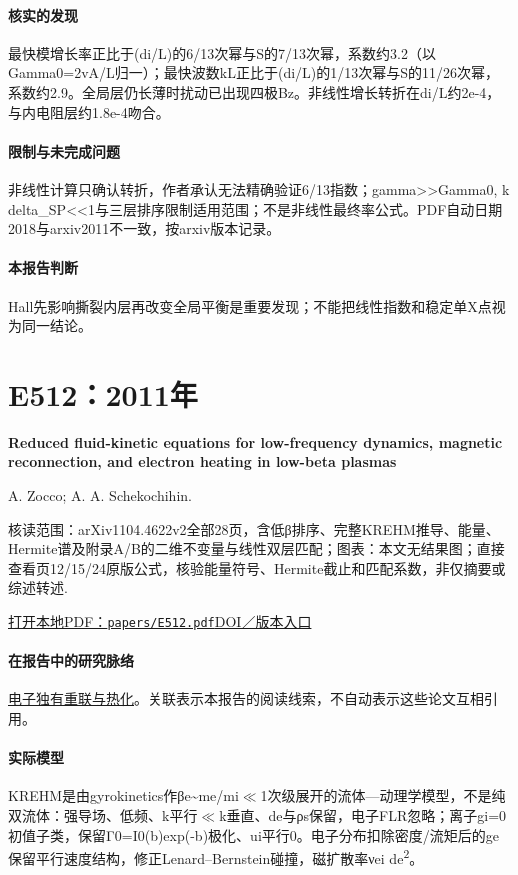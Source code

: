 \paragraph{核实的发现}最快模增长率正比于(di/L)的6/13次幂与S的7/13次幂，系数约3.2（以Gamma0=2vA/L归一）；最快波数kL正比于(di/L)的1/13次幂与S的11/26次幂，系数约2.9。全局层仍长薄时扰动已出现四极Bz。非线性增长转折在di/L约2e-4，与内电阻层约1.8e-4吻合。

\paragraph{限制与未完成问题}非线性计算只确认转折，作者承认无法精确验证6/13指数；gamma>>Gamma0, k delta\_SP<<1与三层排序限制适用范围；不是非线性最终率公式。PDF自动日期2018与arxiv2011不一致，按arxiv版本记录。

\paragraph{本报告判断}Hall先影响撕裂内层再改变全局平衡是重要发现；不能把线性指数和稳定单X点视为同一结论。

\section{E512：2011年}\label{paper:E512}

\textbf{Reduced fluid-kinetic equations for low-frequency dynamics,  magnetic reconnection,  and electron heating in low-beta plasmas}\citep{E512}\

A. Zocco;  A. A. Schekochihin.

\textsf{核读范围：}arXiv1104.4622v2全部28页，含低β排序、完整KREHM推导、能量、Hermite谱及附录A/B的二维不变量与线性双层匹配；\textsf{图表：}本文无结果图；直接查看页12/15/24原版公式，核验能量符号、Hermite截止和匹配系数，非仅摘要或综述转述.

\href{run:papers/E512.pdf}{打开本地PDF：\texttt{papers/E512.pdf}}\quad\href{https://doi.org/10.1063/1.3628639}{DOI／版本入口}

\paragraph{在报告中的研究脉络}\hyperref[story:energy]{电子独有重联与热化}。关联表示本报告的阅读线索，不自动表示这些论文互相引用。

\paragraph{实际模型}KREHM是由gyrokinetics作βe\textasciitilde{}me/mi\ensuremath{\ll}1次级展开的流体—动理学模型，不是纯双流体：强导场、低频、k平行\ensuremath{\ll}k垂直、de与ρs保留，电子FLR忽略；离子gi=0初值子类，保留Γ0=I0(b)exp(-b)极化、ui平行0。电子分布扣除密度/流矩后的ge保留平行速度结构，修正Lenard–Bernstein碰撞，磁扩散率νei de\textsuperscript{2}。

